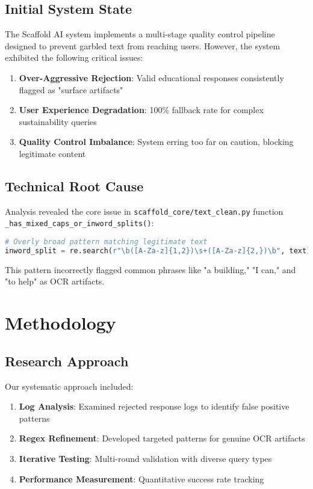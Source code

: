 \documentclass[12pt,a4paper]{article}
\begin{document}
\subsection{Initial System State}
The Scaffold AI system implements a multi-stage quality control pipeline designed to prevent garbled text from reaching users. However, the system exhibited the following critical issues:

\begin{enumerate}
    \item \textbf{Over-Aggressive Rejection}: Valid educational responses consistently flagged as "surface artifacts"
    \item \textbf{User Experience Degradation}: 100\% fallback rate for complex sustainability queries
    \item \textbf{Quality Control Imbalance}: System erring too far on caution, blocking legitimate content
\end{enumerate}

\subsection{Technical Root Cause}
Analysis revealed the core issue in \texttt{scaffold\_core/text\_clean.py} function \texttt{\_has\_mixed\_caps\_or\_inword\_splits()}:

\begin{lstlisting}[language=Python, caption=Original problematic regex pattern]
# Overly broad pattern matching legitimate text
inword_split = re.search(r"\b([A-Za-z]{1,2})\s+([A-Za-z]{2,})\b", text)
\end{lstlisting}

This pattern incorrectly flagged common phrases like "a building," "I can," and "to help" as OCR artifacts.

\section{Methodology}

\subsection{Research Approach}
Our systematic approach included:

\begin{enumerate}
    \item \textbf{Log Analysis}: Examined rejected response logs to identify false positive patterns
    \item \textbf{Regex Refinement}: Developed targeted patterns for genuine OCR artifacts
    \item \textbf{Iterative Testing}: Multi-round validation with diverse query types
    \item \textbf{Performance Measurement}: Quantitative success rate tracking
\end{enumerate}
\end{document}
